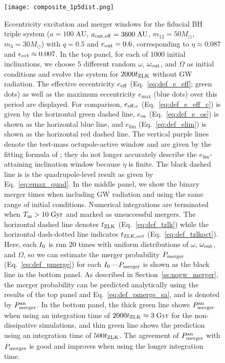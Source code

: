 \documentclass[
        fleqn,
        usenatbib,
    ]{mnras}
\begin{document}
\begin{figure}
    \centering
    \texttt{[image: composite\_1p5dist.png]}
    \caption{Eccentricity excitation and merger windows for the fiducial BH
    triple system ($a = 100\;\mathrm{AU}$, $a_{\rm out, eff} =
    3600\;\mathrm{AU}$, $m_{12} = 50M_{\odot}$, $m_3 = 30M_{\odot}$) with $q =
    0.5$ and $e_{\rm out} = 0.6$, corresponding to $\eta \approx 0.087$ and
    $\epsilon_{\rm oct} \approx 0.007$. In the top panel, for each of $1000$
    initial inclinations, we choose $5$ different random $\omega$, $\omega_{\rm
    out}$, and $\Omega$ as initial conditions and evolve the system for
    $2000t_{\rm ZLK}$ without GW radiation. The effective eccentricity $e_{\rm
    eff}$ (Eq.~\ref{eq:def_e_eff}; green dots) as well as the maximum
    eccentricity $e_{\max}$ (blue dots) over this period are displayed. For
    comparison, $e_{\rm eff, c}$ (Eq.~\ref{eq:def_e_eff_c}) is given by the
    horizontal green dashed line, $e_{\rm os}$ (Eq.~\ref{eq:def_e_os}) is shown
    as the horizontal blue line, and $e_{\lim}$ (Eq.~\ref{eq:def_elim}) is shown
    as the horizontal red dashed line. The vertical purple lines denote the
    test-mass octupole-active window and are given by the fitting formula of
    \citet{MLL16}; they do not longer accurately describe the
    $e_{\lim}$-attaining inclination window because $\eta$ is finite. The black
    dashed line is is the quadrupole-level result as given by
    Eq.~\eqref{eq:emax_quad}. In the middle panel, we show the binary merger
    times when including GW radiation and using the same range of initial
    conditions. Numerical integrations are terminated when $T_{\rm m} >
    10\;\mathrm{Gyr}$ and marked as unsuccessful mergers. The horizontal dashed
    line denotes $t_{\rm ZLK}$ (Eq.~\ref{eq:def_tzlk}) while the horizontal
    dash-dotted line indicates $t_{\rm ZLK, oct}$ (Eq.~\ref{eq:def_tzlkoct}).
    Here, each $I_{\rm 0}$ is run $20$ times with uniform distributions of
    $\omega$, $\omega_{\rm out}$, and $\Omega$, so we can estimate the merger
    probability $P_{\rm merger}$ (Eq.~\ref{eq:def_pmerge}) for each $I_{\rm
    0}$---$P_{\rm merger}$ is shown as the black line in the bottom panel. As
    described in Section~\ref{ss:nogw_merger}, the merger probability can be
    predicted analytically using the results of the top panel and
    Eq.~\eqref{eq:def_pmerge_sa}, and is denoted by $P_{\rm merger}^{\rm an}$.
    In the bottom panel, the thick green line shows $P_{\rm merger}^{\rm an}$
    when using an integration time of $2000 t_{\rm ZLK} \approx 3\;\mathrm{Gyr}$
    for the non-dissipative simulations, and thin green line shows the
    prediction using an integration time of $500 t_{\rm ZLK}$. The agreement of
    $P_{\rm merger}^{\rm an}$ with $P_{\rm merger}$ is good and improves when
    using the longer integration time.
    }\label{fig:composite_dist}
\end{figure}
\end{document}
